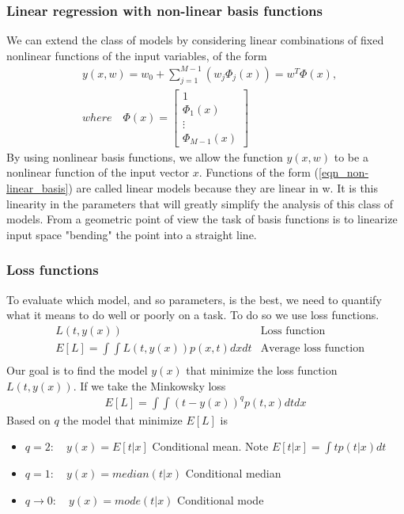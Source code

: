 \documentclass[../main.tex]{subfiles}
\begin{document}
\subsubsection{Linear regression with non-linear basis functions}
We can extend the class of models by considering linear combinations of fixed nonlinear functions of the input variables, of the form
\begin{equation} \label{eqn_non-linear_basis}
    \begin{split}
         & y(x,w)=w_0+\sum_{j=1}^{M-1}(w_j\Phi_j(x))=w^T\Phi(x),                                   \\
         & where \quad \Phi(x)=\begin{bmatrix}1\\ \Phi_1(x) \\ \vdots \\\Phi_{M-1}(x)\end{bmatrix}
    \end{split}
\end{equation}
By using nonlinear basis functions\footnotemark, we allow the function $y(x,w)$ to be a nonlinear
function of the input vector $x$. Functions of the form (\ref{eqn_non-linear_basis}) are called linear
models because they are linear in w. It is this linearity in the parameters
that will greatly simplify the analysis of this class of models. From a geometric point of view the task of basis functions is to linearize input space "bending" the point into a straight line.


\subsubsection{Loss functions}
To evaluate which model, and so parameters, is the best, we need to quantify what it means to do well or poorly on a task. To do so we use loss functions.
\begin{align*}
     & L(t,y(x))                         & \text{Loss function}         \\
     & E[L]=\int\int L(t,y(x))p(x,t)dxdt & \text{Average loss function} \\
\end{align*}
Our goal is to find the model $y(x)$ that minimize the loss function $L(t,y(x))$.
If we take the Minkowsky loss
\begin{equation}
    \begin{split}
        E[L]=\int \int (t-y(x))^qp(t,x)dtdx
    \end{split}
\end{equation}
Based on $q$ the model that minimize $E[L]$ is
\begin{itemize}
    \item $q=2: \quad y(x) = E[t|x]$ Conditional mean. Note $E[t|x]=\int tp(t|x)dt$
    \item $q=1: \quad y(x) = median(t|x)$ Conditional median
    \item $q\xrightarrow{}0: \quad y(x) = mode(t|x)$ Conditional mode
\end{itemize}
\end{document}
